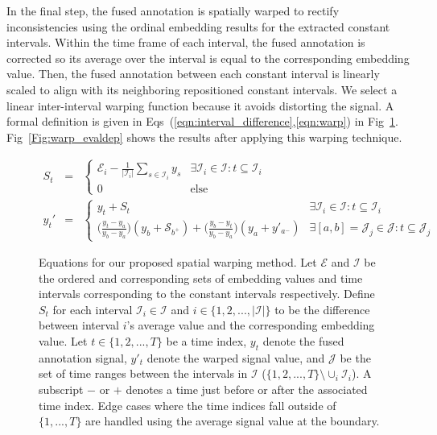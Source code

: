 \documentclass[10pt,letterpaper]{article}
\begin{document}
In the final step, the fused annotation is spatially warped to rectify inconsistencies using the ordinal embedding results for the extracted constant intervals.  Within the time frame of each interval, the fused annotation is corrected so its average over the interval is equal to the corresponding embedding value.  Then, the fused annotation between each constant interval is linearly scaled to align with its neighboring repositioned constant intervals.  We select a linear inter-interval warping function because it avoids distorting the signal.  A formal definition is given in Eqs~(\ref{eqn:interval_difference},\ref{eqn:warp}) in Fig~\ref{Fig:equations}.  Fig~\ref{Fig:warp_evaldep} shows the results after applying this warping technique.

\begin{figure}[!t]
\begin{adjustwidth}{-2.25in}{0in}
\normalsize
\setcounter{equation}{0}
\begin{eqnarray}
\label{eqn:interval_difference}
S_t &=& 
\begin{cases}
\mathcal{E}_i - \frac{1}{|\mathcal{I}_i|}\sum\limits_{s \in \mathcal{I}_i} y_{s} & \exists \mathcal{I}_i \in \mathcal{I} : t \subseteq \mathcal{I}_i \\
0 & \text{else}
\end{cases} \\
\label{eqn:warp}
y_t' &=& 
\begin{cases}
y_t + S_t & \exists \mathcal{I}_i \in \mathcal{I} : t \subseteq \mathcal{I}_i \\
\Big(\frac{y_t-y_a}{y_b-y_a}\Big)(y_b + \mathcal{S}_{b^+}) + \Big(\frac{y_b-y_t}{y_b-y_a}\Big)(y_a + y'_{a^-}) & \exists [a,b] = \mathcal{J}_j \in \mathcal{J} : t \subseteq \mathcal{J}_j
\end{cases}
\end{eqnarray}
\hrulefill
\vspace*{4pt}
\caption{Equations for our proposed spatial warping method. Let $\mathcal{E}$ and $\mathcal{I}$ be the ordered and corresponding sets of embedding values and time intervals corresponding to the constant intervals respectively.  Define $S_t$ for each interval $\mathcal{I}_i \in \mathcal{I}$ and $i \in \{1,2,...,|\mathcal{I}|\}$ to be the difference between interval $i$'s average value and the corresponding embedding value.  Let $t \in \{1,2,...,T\}$ be a time index, $y_t$ denote the fused annotation signal, $y'_t$ denote the warped signal value, and $\mathcal{J}$ be the set of time ranges between the intervals in $\mathcal{I}$ ($\{1,2,...,T\} \setminus \cup_{i} \mathcal{I}_i$).  A subscript $-$ or $+$ denotes a time just before or after the associated time index.  Edge cases where the time indices fall outside of $\{1,...,T\}$ are handled using the average signal value at the boundary.}
\label{Fig:equations}
\end{adjustwidth}
\end{figure}
\end{document}
